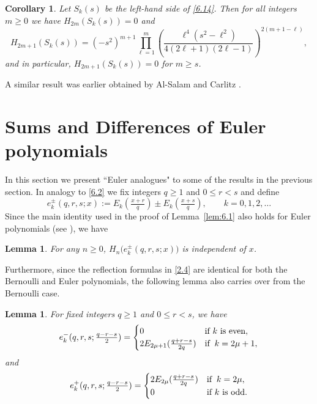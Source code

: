 \documentclass{amsart}
\theoremstyle{plain}
\newtheorem{corollary}[theorem]{Corollary}
\newtheorem{lemma}[theorem]{Lemma}
\numberwithin{equation}{section}
\begin{document}
\begin{corollary}\label{cor:6.7}
Let $S_k(s)$ be the left-hand side of \eqref{6.14}. Then for all integers 
$m\geq 0$ we have $H_{2m}(S_k(s))=0$ and
\[
H_{2m+1}(S_k(s))=(-s^2)^{m+1}\prod_{\ell=1}^m
\left(\frac{\ell^4(s^2-\ell^2)}{4(2\ell+1)(2\ell-1)}\right)^{2(m+1-\ell)},
\]
and in particular, $H_{2m+1}(S_k(s))=0$ for $m\geq s$.
\end{corollary}

A similar result was earlier obtained by Al-Salam and Carlitz \cite[Eq.~(7.1)]{AC}.

\section{Sums and Differences of Euler polynomials}

In this section we present ``Euler analogues" to some of the results in the
previous section. In analogy to \eqref{6.2} we fix integers $q\geq 1$ and
$0\leq r<s$ and define
\begin{equation}\label{4.1}
e_k^{\pm}(q,r,s;x) := E_k(\tfrac{x+r}{q})\pm E_k(\tfrac{x+s}{q}),
\qquad k=0, 1, 2,\ldots
\end{equation}
Since the main identity used in the proof of Lemma~\ref{lem:6.1} also holds
for Euler polynomials (see \cite[Eq.~24.4.13]{DLMF}), we have

\begin{lemma}\label{lem:4.1}
For any $n\geq 0$, $H_n\big(e_k^{\pm}(q,r,s;x)\big)$ is independent of $x$.
\end{lemma}
Furthermore, since the reflection formulas in \eqref{2.4} are identical for
both the Bernoulli and Euler polynomials, the following lemma also carries
over from the Bernoulli case.

\begin{lemma}\label{lem:4.2}
For fixed integers $q\geq 1$ and $0\leq r<s$, we have
\begin{equation}\label{4.2}
e_k^{-}(q,r,s;\tfrac{q-r-s}{2}) = \begin{cases}
0 &\hbox{if $k$ is even},\\
2E_{2\mu+1}(\tfrac{q+r-s}{2q}) &\hbox{if}\;\;k=2\mu+1,
\end{cases}
\end{equation}
and
\begin{equation}\label{4.3}
e_k^{+}(q,r,s;\tfrac{q-r-s}{2}) = \begin{cases}
2E_{2\mu}(\tfrac{q+r-s}{2q}) &\hbox{if}\;\;k=2\mu,\\
0 &\hbox{if $k$ is odd}.
\end{cases}
\end{equation}
\end{lemma}
\end{document}
